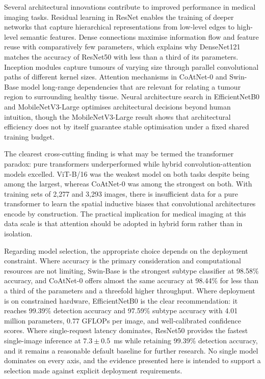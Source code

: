 \documentclass[final,3p,times,number]{elsarticle}
\begin{document}
Several architectural innovations contribute to improved performance in medical imaging tasks. Residual learning in ResNet enables the training of deeper networks that capture hierarchical representations from low-level edges to high-level semantic features. Dense connections maximise information flow and feature reuse with comparatively few parameters, which explains why DenseNet121 matches the accuracy of ResNet50 with less than a third of its parameters. Inception modules capture tumours of varying size through parallel convolutional paths of different kernel sizes. Attention mechanisms in CoAtNet-0 and Swin-Base model long-range dependencies that are relevant for relating a tumour region to surrounding healthy tissue. Neural architecture search in EfficientNetB0 and MobileNetV3-Large optimises architectural decisions beyond human intuition, though the MobileNetV3-Large result shows that architectural efficiency does not by itself guarantee stable optimisation under a fixed shared training budget.

The clearest cross-cutting finding is what may be termed the transformer paradox: pure transformers underperformed while hybrid convolution-attention models excelled. ViT-B/16 was the weakest model on both tasks despite being among the largest, whereas CoAtNet-0 was among the strongest on both. With training sets of 2,277 and 3,293 images, there is insufficient data for a pure transformer to learn the spatial inductive biases that convolutional architectures encode by construction. The practical implication for medical imaging at this data scale is that attention should be adopted in hybrid form rather than in isolation.

Regarding model selection, the appropriate choice depends on the deployment constraint. Where accuracy is the primary consideration and computational resources are not limiting, Swin-Base is the strongest subtype classifier at 98.58\% accuracy, and CoAtNet-0 offers almost the same accuracy at 98.44\% for less than a third of the parameters and a threefold higher throughput. Where deployment is on constrained hardware, EfficientNetB0 is the clear recommendation: it reaches 99.39\% detection accuracy and 97.59\% subtype accuracy with 4.01 million parameters, 0.77 GFLOPs per image, and well-calibrated confidence scores. Where single-request latency dominates, ResNet50 provides the fastest single-image inference at $7.3\pm 0.5$~ms while retaining 99.39\% detection accuracy, and it remains a reasonable default baseline for further research. No single model dominates on every axis, and the evidence presented here is intended to support a selection made against explicit deployment requirements.
\end{document}
